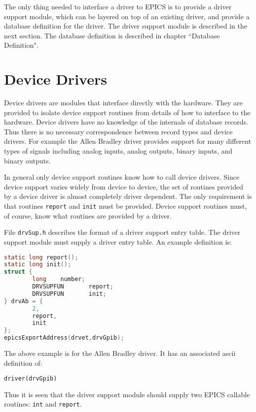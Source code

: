 The only thing needed to interface a driver to EPICS is to provide a driver support module, which can be layered on top of 
an existing driver, and provide a database definition for the driver. The driver support module is described in the next 
section. The database definition is described in chapter ``Database Definition".

\section{Device Drivers}

Device drivers are modules that interface directly with the hardware. They are provided to isolate device support routines 
from details of how to interface to the hardware. Device drivers have no knowledge of the internals of database records. 
Thus there is no necessary correspondence between record types and device drivers. For example the Allen Bradley driver 
provides support for many different types of signals including analog inputs, analog outputs, binary inputs, and binary 
outputs. 

In general only device support routines know how to call device drivers. Since device support varies widely from device 
to device, the set of routines provided by a device driver is almost completely driver dependent. The only requirement is 
that routines \verb|report| and \verb|init| must be provided. Device support routines must, of course, know what routines are 
provided by a driver.

File \verb|drvSup.h| describes the format of a driver support entry table. The driver support module must supply a driver entry 
table. An example definition is:

\begin{lstlisting}[language=C]
static long report();
static long init();
struct {
        long    number;
        DRVSUPFUN       report;
        DRVSUPFUN       init;
} drvAb = {
        2,
        report,
        init
};
epicsExportAddress(drvet,drvGpib);
\end{lstlisting}

The above example is for the Allen Bradley driver. It has an associated ascii definition of:

\begin{verbatim}
driver(drvGpib)
\end{verbatim}

Thus it is seen that the driver support module should supply two EPICS callable routines: \verb|int| and \verb|report|.

